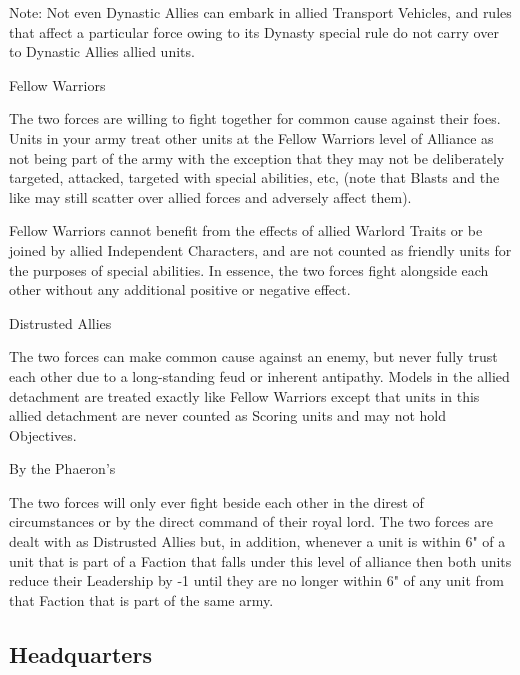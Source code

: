 Note: Not even Dynastic Allies can embark in allied Transport Vehicles, and rules that affect a particular force owing to its Dynasty special rule do not carry over to Dynastic Allies allied units.

\noindent
\blackskull Fellow Warriors

The two forces are willing to fight together for common cause against their foes. Units in your army treat other units at the Fellow Warriors level of Alliance as not being part of the army with the exception that they may not be deliberately targeted, attacked, targeted with special abilities, etc, (note that Blasts and the like may still scatter over allied forces and adversely affect them).

Fellow Warriors cannot benefit from the effects of allied Warlord Traits or be joined by allied Independent Characters, and are not counted as friendly units for the purposes of special abilities. In essence, the two forces fight alongside each other without any additional positive or negative effect.

\noindent
\greyskull Distrusted Allies

The two forces can make common cause against an enemy, but never fully trust each other due to a long-standing feud or inherent antipathy. Models in the allied detachment are treated exactly like Fellow Warriors except that units in this allied detachment are never counted as Scoring units and may not hold Objectives.

\noindent
\redskull By the Phaeron's

The two forces will only ever fight beside each other in the direst of circumstances or by the direct command of their royal lord. The two forces are dealt with as Distrusted Allies but, in addition, whenever a unit is within 6" of a unit that is part of a Faction that falls under this level of alliance then both units reduce their Leadership by -1 until they are no longer within 6" of any unit from that Faction that is part of the same army.


\newpage
\subsection{Headquarters}

\newpage
\subsubsection[Destroyer Lord]{}

